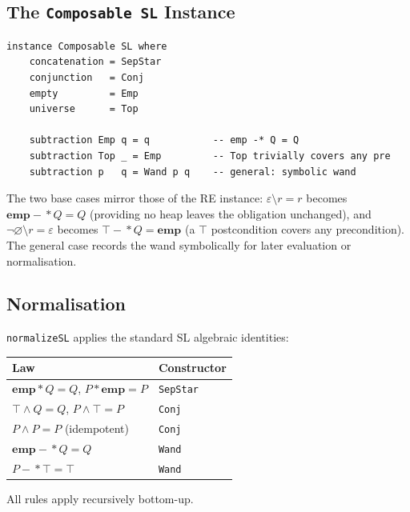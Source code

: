 \documentclass[acmsmall,screen]{acmart}
\newcommand{\sep}{*}
\newcommand{\wand}{-\!\!*}
\newcommand{\univ}{\neg\varnothing}
\begin{document}
\subsection{The \lstinline{Composable SL} Instance}

\begin{lstlisting}
instance Composable SL where
    concatenation = SepStar
    conjunction   = Conj
    empty         = Emp
    universe      = Top

    subtraction Emp q = q           -- emp -* Q = Q
    subtraction Top _ = Emp         -- Top trivially covers any pre
    subtraction p   q = Wand p q    -- general: symbolic wand
\end{lstlisting}

\noindent
The two base cases mirror those of the RE instance:
$\varepsilon \setminus r = r$ becomes $\mathbf{emp} \wand Q = Q$
(providing no heap leaves the obligation unchanged), and
$\univ \setminus r = \varepsilon$ becomes $\top \wand Q = \mathbf{emp}$
(a $\top$ postcondition covers any precondition).
The general case records the wand symbolically for later evaluation
or normalisation.

\subsection{Normalisation}

\lstinline{normalizeSL} applies the standard SL algebraic identities:

\begin{center}
\begin{tabular}{ll}
\toprule
Law & Constructor \\
\midrule
$\mathbf{emp} \sep Q = Q$, $P \sep \mathbf{emp} = P$ & \lstinline{SepStar} \\
$\top \wedge Q = Q$, $P \wedge \top = P$              & \lstinline{Conj} \\
$P \wedge P = P$ (idempotent)                          & \lstinline{Conj} \\
$\mathbf{emp} \wand Q = Q$                            & \lstinline{Wand} \\
$P \wand \top = \top$                                  & \lstinline{Wand} \\
\bottomrule
\end{tabular}
\end{center}

\noindent
All rules apply recursively bottom-up.

\end{document}
